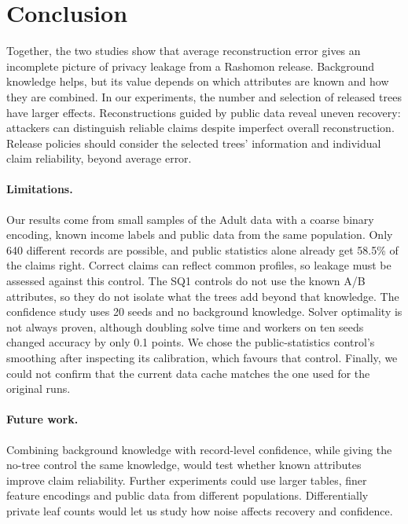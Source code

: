 \section{Conclusion}

Together, the two studies show that average reconstruction error gives an incomplete
picture of privacy leakage from a Rashomon release. Background knowledge helps, but its
value depends on which attributes are known and how they are combined. In our experiments,
the number and selection of released trees have larger effects. Reconstructions guided by public data reveal uneven recovery: attackers can distinguish
reliable claims despite imperfect overall reconstruction.
Release policies should consider the selected trees' information and individual claim
reliability, beyond average error.

\paragraph{Limitations.} Our results come from small samples of the Adult data with a coarse
  binary encoding, known income labels and public data from the same population. Only 640
  different records are possible, and public statistics alone already get 58.5\% of the
  claims right. Correct claims can reflect common profiles, so leakage must be assessed against
  this control. The SQ1 controls do
  not use the known A/B attributes, so they do not isolate what the trees add beyond that
  knowledge. The confidence study uses 20 seeds and no background knowledge. Solver optimality
  is not always proven, although doubling solve time and workers on ten seeds changed
  accuracy by only 0.1 points. We chose the public-statistics control's smoothing
  after inspecting its calibration, which favours that control. Finally, we could not confirm that the current data
  cache matches the one used for the original runs.

\paragraph{Future work.} Combining background knowledge with record-level confidence, while giving the
  no-tree control the same knowledge, would test whether known attributes improve claim reliability.
  Further experiments could use larger tables, finer feature encodings and public data
  from different populations. Differentially private leaf counts would let us study how noise affects recovery and confidence.
